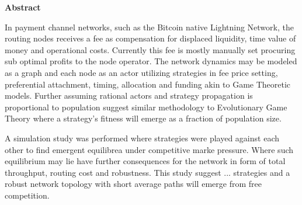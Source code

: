 \centering \textbf{Abstract}

In payment channel networks, such as the Bitcoin native Lightning Network, the routing nodes receives a fee as compensation for displaced liquidity, time value of money and operational costs. Currently this fee is mostly manually set procuring sub optimal profits to the node operator. The network dynamics may be modeled as a graph and each node as an actor utilizing strategies in fee price setting, preferential attachment, timing, allocation and funding akin to Game Theoretic models. Further assuming rational actors and strategy propagation is proportional to population suggest similar methodology to Evolutionary Game Theory where a strategy's fitness will emerge as a fraction of population size. 

A simulation study was performed where strategies were played against each other to find emergent equilibrea under competitive marke pressure. Where such equilibrium may lie have further consequences for the network in form of total throughput, routing cost and robustness. This study suggest ... strategies and a robust network topology with short average paths will emerge from free competition.

